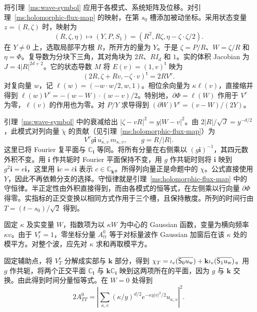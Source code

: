 将引理~\ref{ms:wave-symbol} 应用于各模式、系统矩阵及位移。对引理~\ref{ms:holomorphic-flux-map} 的映射，在第 $s_0$ 槽添加被动坐标。采用状态变量 $z=(R,\zeta)$ 时，映射为
\[
(R,\zeta,\eta)\longmapsto(Y,P,S_1)=(R^2,R\zeta,\eta-\zeta\cdot\zeta/2).
\]
在 $Y\ne0$ 上，选取局部平方根 $R$，所开方的量为 $Y$。于是 $\zeta=P/R$、$W=\zeta/R$ 和 $\eta=\Phi$。复导数为分块下三角，其对角块为 $2R$、$RI_d$ 和 $1$。实的体积 Jacobian 为 $J=4|R|^{2d+2}$。它的状态导数 $M$ 将 $E(v)=(1,v)^{\mathsf t}$ 映为
\[
(2R,\zeta+Rv,-\zeta\cdot v)^{\mathsf t}=2RV^v.
\]
对复向量 $w$，记 $\ell(w)=(-w\cdot w/2,w,1)$。相位余向量为 $\kappa\ell(v)$，直接缩并得到 $\ell(w)V^v=-(w-W)\cdot(w-v)/2$。特别地，$\partial\Phi=\ell(W)$ 作用于 $V^v$ 为零，$\ell(v)$ 的作用也为零。对 $P/Y$ 求导得到 $(\partial W)V^v=(v-W)/(2Y)$。

引理~\ref{ms:wave-symbol} 中的衰减给出 $|\zeta-vR|^2=y|W-v|^2$。由 $2|R|/\sqrt J=y^{-d/2}$，此模式对列向量 $\widetilde\chi$ 的贡献（见引理~\ref{ms:holomorphic-flux-map}）为
\[
V^v g\mathbf i\,\overline{u_{\kappa,v}}\,m_{\kappa,v},
\qquad g=R/|R|.
\]
这里已将 Fourier 复平面与 $\mathbb C_{\mathbf i}$ 等同。将所有分量在右侧乘以 $(g\mathbf i)^{-1}$，其四元数外积不变。用 $\mathbf i$ 作共轭时 Fourier 平面保持不变，用 $g$ 作共轭时则将 $\mathbf i$ 映到 $g^2\mathbf i=e\mathbf i$，这里用 $\mathbf i c=\bar c\mathbf i$ 表示 $c\in\mathbb C_{\mathbf k}$。所得列向量正是命题中的 $\chi$。公式直接使用 $Y$，因此不再依赖分支的选择。守恒律就是引理~\ref{ms:holomorphic-flux-map} 中的守恒律。半正定性由外积直接得到，而由各模式的恒等式，在左侧乘以行向量 $\partial\Phi$ 得零。实指标的正交变换以相同方式作用于三个槽，且保持散度。所列的时间行由 $T=(t-s_0)/\sqrt2$ 得到。

固定 $\kappa$ 及实变量 $W$，指数项为以 $\kappa W$ 为中心的 Gaussian 函数，变量为横向频率 $\kappa v$。由于 $V_t^v=1$，零坐标分量 $A^0_{tt}$ 等于对标量波作 Gaussian 加窗后在该 $\kappa$ 处的模平方。对整个波，应先对 $\kappa$ 求和再取模平方。

固定辅助点，将 $V_T^v$ 分解成实部与 $\mathbf k$ 部分，得到 $\chi_T=\iota_e(\overline{\mathsf S_0u_{\rm w}})+\mathbf k\iota_e(\overline{\mathsf S_1u_{\rm w}})$。用 $g$ 作共轭，将两个正交平面 $\mathbb C_{\mathbf i}$ 与 $\mathbf k\mathbb C_{\mathbf i}$ 映到这两项所在的平面，因为 $g$ 与 $\mathbf k$ 交换。由此得到时间分量恒等式。在 $W=0$ 处得到
\[
2A^0_{TT}=\left|\sum_{\kappa,v}(\kappa/y)^{d/2}
 e^{-\kappa y|v|^2/2}u_{\kappa,v}\right|^2.
\]
